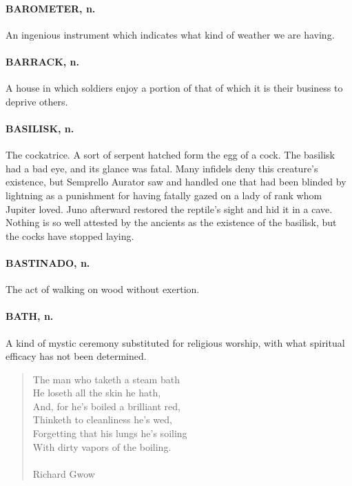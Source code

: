 \documentclass[11pt]{article}
\begin{document}
\paragraph{BAROMETER, n.}  An ingenious instrument which indicates what kind of
weather we are having.

\paragraph{BARRACK, n.}  A house in which soldiers enjoy a portion of that of
which it is their business to deprive others.

\paragraph{BASILISK, n.}  The cockatrice.  A sort of serpent hatched form the egg
of a cock.  The basilisk had a bad eye, and its glance was fatal.
Many infidels deny this creature's existence, but Semprello Aurator
saw and handled one that had been blinded by lightning as a punishment
for having fatally gazed on a lady of rank whom Jupiter loved.  Juno
afterward restored the reptile's sight and hid it in a cave.  Nothing
is so well attested by the ancients as the existence of the basilisk,
but the cocks have stopped laying.

\paragraph{BASTINADO, n.}  The act of walking on wood without exertion.

\paragraph{BATH, n.}  A kind of mystic ceremony substituted for religious worship,
with what spiritual efficacy has not been determined.

\begin{quote}   The man who taketh a steam bath \\
  He loseth all the skin he hath, \\
  And, for he's boiled a brilliant red, \\
  Thinketh to cleanliness he's wed, \\
  Forgetting that his lungs he's soiling \\
  With dirty vapors of the boiling. \\
 \\
Richard Gwow \end{quote}
\end{document}
